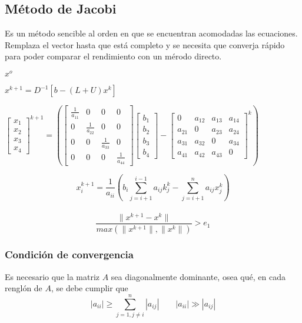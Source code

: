 \subsection{M\'etodo de Jacobi}
Es un m\'etodo sencible al orden en que se encuentran acomodadas las ecuaciones. Remplaza el vector hasta que est\'a completo y se necesita que converja r\'apido para poder comparar el rendimiento con un m\'erodo directo.
\begin{center}
$x^o$ \end{center}
\begin{center}$x^{k+1}=D^{-1}[b-(L+U)x^k]$\end{center}
\begin{center}$\begin{bmatrix}
x_1 \\ x_2 \\ x_3 \\ x_4 
\end{bmatrix}^{k+1}=\left(\begin{bmatrix}
\frac{1}{a_{11}} & 0 & 0 & 0 \\
0 & \frac{1}{a_{22}} & 0 & 0 \\
0 & 0 & \frac{1}{a_{33}} & 0 \\
0 & 0 & 0 & \frac{1}{a_{44}}
\end{bmatrix}\begin{bmatrix}
b_1 \\ b_2 \\ b_3 \\ b_4
\end{bmatrix}-\begin{bmatrix}
0 & a_{12} & a_{13} & a_{14} \\
a_{21} & 0 & a_{23} & a_{24} \\
a_{31} & a_{32} & 0 & a_{34} \\
a_{41} & a_{42} & a_{43} & 0
\end{bmatrix}^k\right)$
\end{center}
\begin{displaymath}
x_i^{k+1}=\frac{1}{a_{ii}}(b_i\sum_{j=i+1}^{i-1}a_{ij}k_j^k-\sum _{j=i+1}^na_{ij}x_j^k)
\end{displaymath}
\\
\begin{displaymath}
\frac{\parallel x^{k+1}-x^k \parallel}{max(\parallel x^{k+1} \parallel, \parallel x^k \parallel)}>e_1
\end{displaymath}
\subsubsection*{Condici\'on de convergencia}
Es necesario que la matriz $A$ sea diagonalmente dominante, osea qu\'e, en cada rengl\'on de $A$, se debe cumplir que 
\begin{displaymath}
|a_{ii}|\geq \sum_{j=1,j\neq i}^n |a_{ij}| \qquad |a_{ii}|\gg |a_{ij}|
\end{displaymath}
